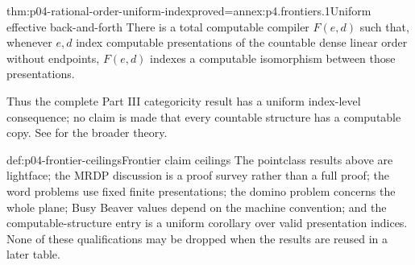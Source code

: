 \begin{hbcorollary}{thm:p04-rational-order-uniform-index}{proved=annex:p4.frontiers.1}{Uniform effective back-and-forth}
There is a total computable compiler \(F(e,d)\) such that, whenever \(e,d\)
index computable presentations of the countable dense linear order without
endpoints, \(F(e,d)\) indexes a computable isomorphism between those
presentations.
\end{hbcorollary}

Thus the complete Part III categoricity result has a uniform index-level
consequence; no claim is made that every countable structure has a computable
copy.  See \textcite[chaps.~1--3]{AshKnight2000} for the broader theory.

\begin{hbwarning}{def:p04-frontier-ceilings}{Frontier claim ceilings}
The pointclass results above are lightface; the MRDP discussion is a proof
survey rather than a full proof; the word problems use fixed finite
presentations; the domino problem concerns the whole plane; Busy Beaver values
depend on the machine convention; and the computable-structure entry is a
uniform corollary over valid presentation indices.  None of these qualifications may be dropped when the results are
reused in a later table.
\end{hbwarning}


